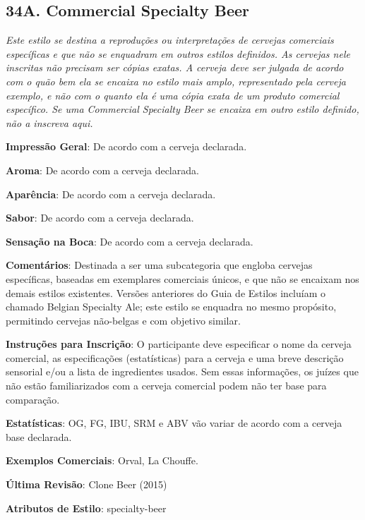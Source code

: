 \subsection*{34A. Commercial Specialty Beer}
\textit{Este estilo se destina a reproduções ou interpretações de cervejas comerciais específicas e que não se enquadram em outros estilos definidos. As cervejas nele inscritas não precisam ser cópias exatas. A cerveja deve ser julgada de acordo com o quão bem ela se encaixa no estilo mais amplo, representado pela cerveja exemplo, e não com o quanto ela é uma cópia exata de um produto comercial específico. Se uma Commercial Specialty Beer se encaixa em outro estilo definido, não a inscreva aqui.}

\textbf{Impressão Geral}: De acordo com a cerveja declarada.

\textbf{Aroma}: De acordo com a cerveja declarada.

\textbf{Aparência}: De acordo com a cerveja declarada.

\textbf{Sabor}: De acordo com a cerveja declarada.

\textbf{Sensação na Boca}: De acordo com a cerveja declarada.

\textbf{Comentários}: Destinada a ser uma subcategoria que engloba cervejas específicas, baseadas em exemplares comerciais únicos, e que não se encaixam nos demais estilos existentes. Versões anteriores do Guia de Estilos incluíam o chamado Belgian Specialty Ale; este estilo se enquadra no mesmo propósito, permitindo cervejas não-belgas e com objetivo similar.

\textbf{Instruções para Inscrição}: O participante deve especificar o nome da cerveja comercial, as especificações (estatísticas) para a cerveja e uma breve descrição sensorial e/ou a lista de ingredientes usados. Sem essas informações, os juízes que não estão familiarizados com a cerveja comercial podem não ter base para comparação.

\textbf{Estatísticas}: OG, FG, IBU, SRM e ABV vão variar de acordo com a cerveja base declarada.

\textbf{Exemplos Comerciais}: Orval, La Chouffe.

\textbf{Última Revisão}: Clone Beer (2015)

\textbf{Atributos de Estilo}: specialty-beer

